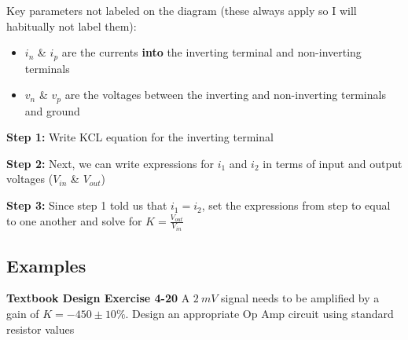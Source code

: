 \documentclass{handout}
\begin{document}
Key parameters not labeled on the diagram (these always apply so I will habitually not label them):
\begin{itemize}
\item $i_n$ \& $i_p$ are the currents \textbf{into} the inverting terminal and non-inverting terminals
\item $v_n$ \& $v_p$ are the voltages between the inverting and non-inverting terminals and ground
\end{itemize}

\textbf{Step 1:}  Write KCL equation for the inverting terminal

\textbf{Step 2:} Next, we can write expressions for $i_1$ and $i_2$ in terms of input and output voltages ($V_{in}$ \& $V_{out}$)

\textbf{Step 3:} Since step 1 told us that $i_1=i_2$, set the expressions from step to equal to one another and solve for $K=\frac{V_{out}}{V_{in}}$


\subsection{Examples}
\textbf{Textbook Design Exercise 4-20}
A $2\ mV$ signal needs to be amplified by a gain of $K=-450 \pm 10\%$.  Design an appropriate Op Amp circuit using standard resistor values
\end{document}
